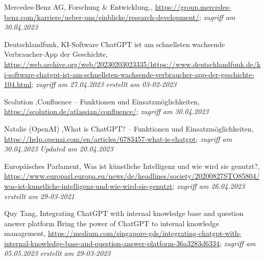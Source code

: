 \begin{thebibliography}{XXXX}
 Mercedes-Benz AG, Forschung \& Entwicklung.,
\url{https://group.mercedes-benz.com/karriere/ueber-uns/einblicke/research-development/}; \textit{zugriff am 30.04.2023} 

 Deutschlandfunk, KI-Software ChatGPT ist am schnellsten wachsende Verbraucher-App der Geschichte,
\url{https://web.archive.org/web/20230203023335/https://www.deutschlandfunk.de/ki-software-chatgpt-ist-am-schnellsten-wachsende-verbraucher-app-der-geschichte-104.html}; \textit{zugriff am 27.04.2023} \textit{erstellt am 03-02-2023}

 Scolution ,Confluence – Funktionen und Einsatzmöglichkeiten,
\url{https://scolution.de/atlassian/confluence/};
\textit{zugriff am 30.04.2023}


 Natalie (OpenAI) ,What is ChatGPT? – Funktionen und Einsatzmöglichkeiten,
\url{https://help.openai.com/en/articles/6783457-what-is-chatgpt};
\textit{zugriff am 30.04.2023} \textit{Updated am 20.04.2023} 


 Europäisches Parlament, Was ist künstliche Intelligenz und wie wird sie genutzt?,
\url{https://www.europarl.europa.eu/news/de/headlines/society/20200827STO85804/was-ist-kunstliche-intelligenz-und-wie-wird-sie-genutzt}; \textit{zugriff am 26.04.2023} \textit{erstellt am 29-03-2021}

 Quy Tang, Integrating ChatGPT with internal knowledge base and question answer platform Bring the power of ChatGPT to internal knowledge management,
\url{https://medium.com/singapore-gds/integrating-chatgpt-with-internal-knowledge-base-and-question-answer-platform-36a3283d6334}; 
\textit{zugriff am 05.05.2023} \textit{erstellt am 29-03-2023}


\end{thebibliography}
